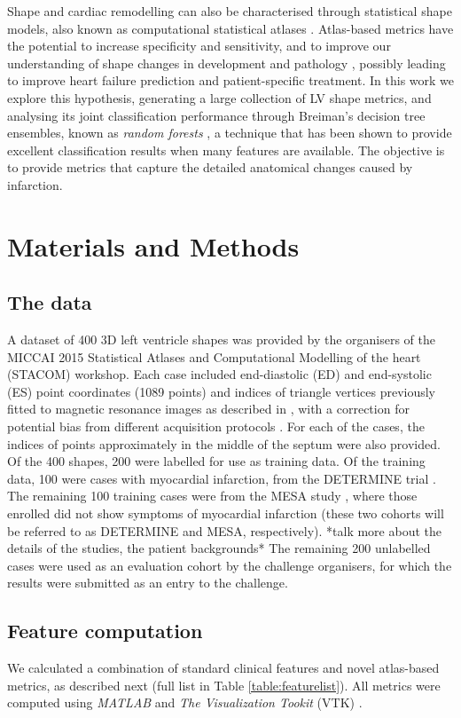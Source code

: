 \documentclass[journal]{IEEEtran}
\begin{document}
Shape and cardiac remodelling can also be characterised through statistical shape models, also known as computational statistical atlases \cite{Cootes1992,Young2009}. Atlas-based metrics have the potential to increase  specificity and sensitivity, and to improve our understanding of shape changes in development and pathology \cite{Lewandowski2012,Lorenz2006}, possibly leading to improve heart failure prediction and patient-specific treatment. In this work we explore this hypothesis, generating a large collection of LV shape metrics, and analysing its joint classification performance through 
Breiman's decision tree ensembles, known as \emph{random forests} \cite{Breiman2001}, a technique that has been shown to provide excellent classification results when many features are available. The objective is to provide metrics that capture the detailed anatomical changes caused by infarction.


\section{Materials and Methods}
	\subsection{The data}
A dataset of 400 3D left ventricle shapes was provided by the organisers of the MICCAI 2015 Statistical Atlases and Computational Modelling of the heart (STACOM) workshop. Each case included end-diastolic (ED) and end-systolic (ES) point coordinates (1089 points) and indices of triangle vertices previously fitted to magnetic resonance images as described in \cite{Young2000}, with a correction for potential bias from different acquisition protocols \cite{Medrano-Gracia2013}. For each of the cases, the indices of points approximately in the middle of the septum were also provided. Of the 400 shapes, 200 were labelled for use as training data. Of the training data, 100 were cases with myocardial infarction, from the DETERMINE trial \cite{Kadish2009}. The remaining 100 training cases were from the MESA study \cite{Bild2002}, where those enrolled did not show symptoms of myocardial infarction (these two cohorts will be referred to as DETERMINE and MESA, respectively).
*talk more about the details of the studies, the patient backgrounds*
 The remaining 200 unlabelled cases were used as an evaluation cohort by the challenge organisers, for which the results were submitted as an entry to the challenge. 


	\subsection{Feature computation}
	We calculated a combination of standard clinical features and novel atlas-based metrics, as described next (full list in Table \ref{table:featurelist}). All metrics were computed using \emph{\mbox{MATLAB}} and \emph{The Visualization Tookit} (VTK) \cite{Schroeder2006}.
\end{document}
